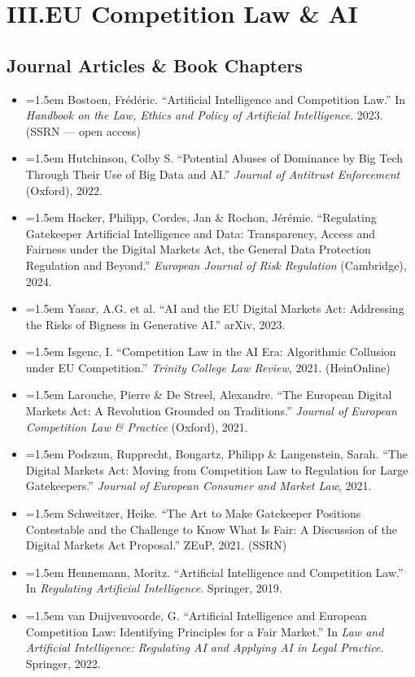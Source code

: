 \documentclass[12pt, letterpaper]{article}
\newcommand{\entry}[1]{%
  \item \hangindent=1.5em \hangafter=1 #1%
}
\begin{document}
\section{III.\quad EU Competition Law \& AI}

\subsection{Journal Articles \& Book Chapters}

\begin{itemize}
\entry{Bostoen, Frédéric. ``Artificial Intelligence and Competition Law.'' In \textit{Handbook on the Law, Ethics and Policy of Artificial Intelligence}. 2023. (SSRN --- open access)}
\entry{Hutchinson, Colby S. ``Potential Abuses of Dominance by Big Tech Through Their Use of Big Data and AI.'' \textit{Journal of Antitrust Enforcement} (Oxford), 2022.}
\entry{Hacker, Philipp, Cordes, Jan \& Rochon, Jérémie. ``Regulating Gatekeeper Artificial Intelligence and Data: Transparency, Access and Fairness under the Digital Markets Act, the General Data Protection Regulation and Beyond.'' \textit{European Journal of Risk Regulation} (Cambridge), 2024.}
\entry{Yasar, A.G. et al. ``AI and the EU Digital Markets Act: Addressing the Risks of Bigness in Generative AI.'' arXiv, 2023.}
\entry{Isgenc, I. ``Competition Law in the AI Era: Algorithmic Collusion under EU Competition.'' \textit{Trinity College Law Review}, 2021. (HeinOnline)}
\entry{Larouche, Pierre \& De Streel, Alexandre. ``The European Digital Markets Act: A Revolution Grounded on Traditions.'' \textit{Journal of European Competition Law \& Practice} (Oxford), 2021.}
\entry{Podszun, Rupprecht, Bongartz, Philipp \& Langenstein, Sarah. ``The Digital Markets Act: Moving from Competition Law to Regulation for Large Gatekeepers.'' \textit{Journal of European Consumer and Market Law}, 2021.}
\entry{Schweitzer, Heike. ``The Art to Make Gatekeeper Positions Contestable and the Challenge to Know What Is Fair: A Discussion of the Digital Markets Act Proposal.'' ZEuP, 2021. (SSRN)}
\entry{Hennemann, Moritz. ``Artificial Intelligence and Competition Law.'' In \textit{Regulating Artificial Intelligence}. Springer, 2019.}
\entry{van Duijvenvoorde, G. ``Artificial Intelligence and European Competition Law: Identifying Principles for a Fair Market.'' In \textit{Law and Artificial Intelligence: Regulating AI and Applying AI in Legal Practice}. Springer, 2022.}

\end{itemize}
\end{document}
